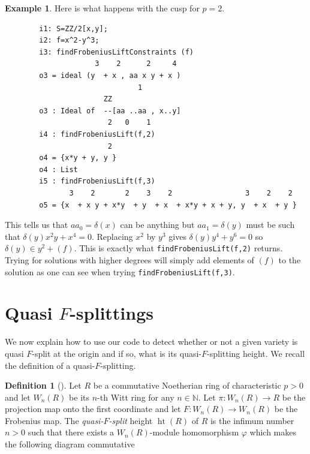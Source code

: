 \documentclass{article}
\theoremstyle{plain}
\theoremstyle{definition}
\newtheorem{example}[theorem]{Example}
\newtheorem{definition}[theorem]{Definition}
\newcommand{\arrow}{arrow}
\newcommand{\N}{\mathbb{N}}
\DeclareMathOperator{\height}{ht}
\renewcommand{\phi}{\varphi}
\renewcommand{\to}{\longrightarrow}
\begin{document}
\begin{example} Here is what happens with the cusp for $p=2$.
    \begin{verbatim}
        i1: S=ZZ/2[x,y];
        i2: f=x^2-y^3;
        i3: findFrobeniusLiftConstraints (f)
                     3    2      2     4
        o3 = ideal (y  + x , aa x y + x )
                               1
                       ZZ
        o3 : Ideal of  --[aa ..aa , x..y]
                        2   0    1
        i4 : findFrobeniusLift(f,2)
                        2	
        o4 = {x*y + y, y }
        o4 : List
        i5 : findFrobeniusLift(f,3)
               3    2       2    3    2                 3    2    2
        o5 = {x  + x y + x*y  + y  + x  + x*y + x + y, y  + x  + y }
    \end{verbatim}
\end{example}
This tells us that $aa_0=\delta(x)$ can be anything but $aa_1=\delta(y)$ must be such that $\delta(y)x^2y+x^4=0$. Replacing $x^2$ by $y^3$ gives $\delta(y)y^4+y^6=0$ so $\delta(y)\in y^2 +(f)$. This is exactly what \texttt{findFrobeniusLift(f,2)} returns. Trying for solutions with higher degrees will simply add elements of $(f)$ to the solution as one can see when trying \texttt{findFrobeniusLift(f,3)}.


\section{Quasi $F$-splittings}\label{section quasiFSplitting}
We now explain how to use our code to detect whether or not a given variety is quasi $F$-split at the origin and if so, what is its quasi-$F$-splitting height.
We recall the definition of a quasi-$F$-splitting. 
\begin{definition}[\cite{YobukoQuasiFSplittingLiftingCY}]
Let $R$ be a commutative Noetherian ring of characteristic $p>0$ and let $W_n(R)$ be its $n$-th Witt ring for any $n\in \N$. Let $\pi\colon W_n(R)\to R$ be the projection map onto the first coordinate and let $F\colon W_n(R)\to W_n(R)$ be the Frobenius map. The \emph{quasi-$F$-split} height $\height(R)$ of $R$ is the infimum number $n>0$ such that there exists a $W_n(R)$-module homomorphism $\phi$ which makes the following diagram commutative
\begin{center}
\end{center}
\end{definition}
\end{document}
